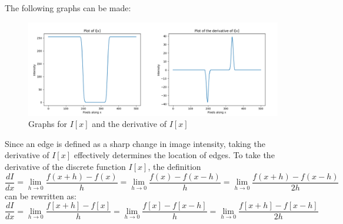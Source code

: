 \documentclass{article}
\begin{document}
The following graphs can be made:
\begin{figure}[!hbtp]
    \centering
    \includegraphics[width=\textwidth]{figures/figure04.png}
    \caption[{Graphs for $I[x]$ and the derivative of $I[x]$}]{\centering Graphs for $I[x]$ and the derivative of $I[x]$}
    \label{fig:Graphs for $I[x]$ and the derivative of $I[x]$}
\end{figure}
Since an edge is defined as a sharp change in image intensity, taking the derivative of $I[x]$
effectively determines the location of edges. To take the derivative of the discrete function $I[x]$,
 the definition
\begin{equation*}
    \frac{dI}{dx} = \lim_{h \to 0}{\frac{f(x+h) - f(x)}{h} = \lim_{h \to 0}{\frac{f(x) - f(x-h)}{h}} = \lim_{h \to 0}{\frac{f(x+h) - f(x-h)}{2h}}}
\end{equation*}
can be rewritten as:
\begin{equation}
    \frac{dI}{dx} = \lim_{h \to 0}{\frac{f[x+h] - f[x]}{h} = \lim_{h \to 0}{\frac{f[x] - f[x-h]}{h}} = \lim_{h \to 0}{\frac{f[x+h] - f[x-h]}{2h}}}
\end{equation}
\end{document}
